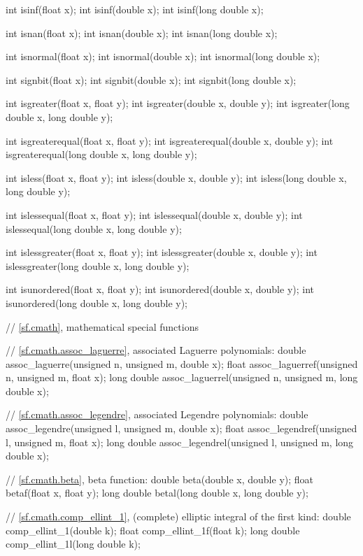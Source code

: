 \begin{codeblock}
{  int isinf(float x);
  int isinf(double x);
  int isinf(long double x);

  int isnan(float x);
  int isnan(double x);
  int isnan(long double x);

  int isnormal(float x);
  int isnormal(double x);
  int isnormal(long double x);

  int signbit(float x);
  int signbit(double x);
  int signbit(long double x);

  int isgreater(float x, float y);
  int isgreater(double x, double y);
  int isgreater(long double x, long double y);

  int isgreaterequal(float x, float y);
  int isgreaterequal(double x, double y);
  int isgreaterequal(long double x, long double y);

  int isless(float x, float y);
  int isless(double x, double y);
  int isless(long double x, long double y);

  int islessequal(float x, float y);
  int islessequal(double x, double y);
  int islessequal(long double x, long double y);

  int islessgreater(float x, float y);
  int islessgreater(double x, double y);
  int islessgreater(long double x, long double y);

  int isunordered(float x, float y);
  int isunordered(double x, double y);
  int isunordered(long double x, long double y);

  // \ref{sf.cmath}, mathematical special functions

  // \ref{sf.cmath.assoc_laguerre}, associated Laguerre polynomials:
  double       assoc_laguerre(unsigned n, unsigned m, double x);
  float        assoc_laguerref(unsigned n, unsigned m, float x);
  long double  assoc_laguerrel(unsigned n, unsigned m, long double x);

  // \ref{sf.cmath.assoc_legendre}, associated Legendre polynomials:
  double       assoc_legendre(unsigned l, unsigned m, double x);
  float        assoc_legendref(unsigned l, unsigned m, float x);
  long double  assoc_legendrel(unsigned l, unsigned m, long double x);

  // \ref{sf.cmath.beta}, beta function:
  double       beta(double x, double y);
  float        betaf(float x, float y);
  long double  betal(long double x, long double y);

  // \ref{sf.cmath.comp_ellint_1}, (complete) elliptic integral of the first kind:
  double       comp_ellint_1(double k);
  float        comp_ellint_1f(float k);
  long double  comp_ellint_1l(long double k);

}
\end{codeblock}
